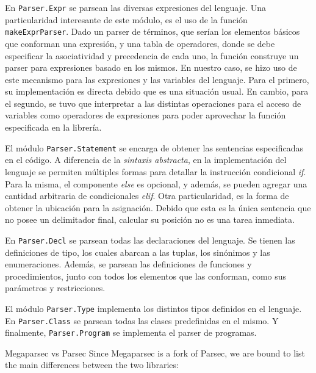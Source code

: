 En \lstinline[style = module]{Parser.Expr} se parsean las diversas expresiones del lenguaje.
Una particularidad interesante de este módulo, es el uso de la función \lstinline[style = haskell]{makeExprParser}.
Dado un parser de términos, que serían los elementos básicos que conforman una expresión, y una tabla de operadores, donde se debe especificar la asociatividad y precedencia de cada uno, la función construye un parser para expresiones basado en los mismos.
En nuestro caso, se hizo uso de este mecanismo para las expresiones y las variables del lenguaje.
Para el primero, su implementación es directa debido que es una situación usual. %
En cambio, para el segundo, se tuvo que interpretar a las distintas operaciones para el acceso de variables como operadores de expresiones para poder aprovechar la función especificada en la librería.

El módulo \lstinline[style = module]{Parser.Statement} se encarga de obtener las sentencias especificadas en el código.
A diferencia de la \textit{sintaxis abstracta}, en la implementación del lenguaje se permiten múltiples formas para detallar la instrucción condicional \textit{if}.
Para la misma, el componente \textit{else} es opcional, y además, se pueden agregar una cantidad arbitraria de condicionales \textit{elif}.
Otra particularidad, es la forma de obtener la ubicación para la asignación.
Debido que esta es la única sentencia que no posee un delimitador final, calcular su posición no es una tarea inmediata.

En \lstinline[style = module]{Parser.Decl} se parsean todas las declaraciones del lenguaje.
Se tienen las definiciones de tipo, los cuales abarcan a las tuplas, los sinónimos y las enumeraciones.
Además, se parsean las definiciones de funciones y procedimientos, junto con todos los elementos que las conforman, como sus parámetros y restricciones.

El módulo \lstinline[style = module]{Parser.Type} implementa los distintos tipos definidos en el lenguaje.
En \lstinline[style = module]{Parser.Class} se parsean todas las clases predefinidas en el mismo.
Y finalmente, \lstinline[style = module]{Parser.Program} se implementa el parser de programas.

\iffalse
Megaparsec vs Parsec
Since Megaparsec is a fork of Parsec, we are bound to list the main differences between the two libraries:
  
